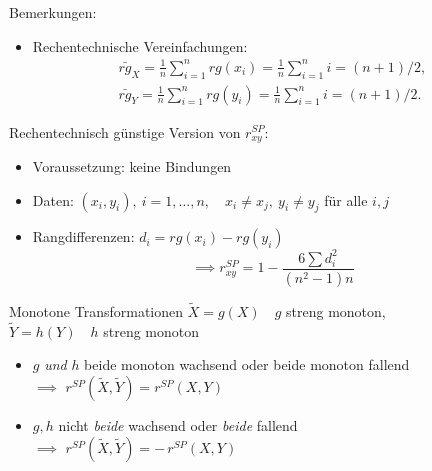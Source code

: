 \documentclass[
  10pt,
  ignorenonframetext,
]{beamer}
\providecommand{\tightlist}{%
  \setlength{\itemsep}{0pt}\setlength{\parskip}{0pt}}
\begin{document}
\begin{frame}{Bemerkungen:}
\label{bemerkungen-3}
\begin{itemize}
\tightlist
\item
  Rechentechnische Vereinfachungen: \[
  \begin{array}{c}
  \bar{rg}_X = \frac{1}{n}\sum_{i=1}^n rg(x_i) = \frac{1}{n}\sum_{i=1}^n i
  = (n+1)/2,\\
  \bar{rg}_Y = \frac{1}{n}\sum_{i=1}^n rg(y_i) = \frac{1}{n}\sum_{i=1}^n i
  = (n+1)/2.
  \end{array}
  \]
\end{itemize}

Rechentechnisch günstige Version von \(r^{SP}_{xy}\):

\begin{itemize}
\tightlist
\item
  Voraussetzung: keine Bindungen
\item
  Daten: \((x_i, y_i),\ i=1, \ldots, n,\quad x_i\neq x_j,\ y_i\neq y_j\)
  für alle \(i,j\)
\item
  Rangdifferenzen: \(d_i = rg(x_i) - rg(y_i)\)\\
  \[\implies r^{SP}_{xy} = 1 - \frac{6 \sum d^2_i}{(n^2 - 1) n}\]
\end{itemize}
\end{frame}

\begin{frame}{Monotone Transformationen}
\label{monotone-transformationen}
\(\tilde{X} = g(X) \quad g\) streng monoton,\\
\(\tilde{Y} = h(Y) \quad h\) streng monoton

\vspace{2em}

\begin{itemize}
\tightlist
\item
  \(g\) \textit{und} \(h\) beide monoton wachsend oder beide monoton
  fallend\\
  \(\implies\) \(r^{SP}(\tilde X, \tilde Y)=r^{SP}(X,Y)\)
\item
  \(g, h\) nicht \emph{beide} wachsend oder \emph{beide} fallend\\
  \(\implies\) \(r^{SP}(\tilde X, \tilde Y)= -\, r^{SP}(X,Y)\)
\end{itemize}
\end{frame}
\end{document}
